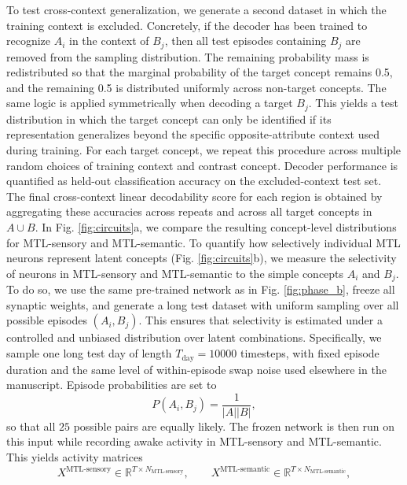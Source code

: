 \documentclass{article}
\begin{document}
To test cross-context generalization, we generate a second dataset in which the training context is excluded. Concretely, if the decoder has been trained to recognize $A_i$ in the context of $B_j$, then all test episodes containing $B_j$ are removed from the sampling distribution. The remaining probability mass is redistributed so that the marginal probability of the target concept remains 0.5, and the remaining 0.5 is distributed uniformly across non-target concepts. The same logic is applied symmetrically when decoding a target $B_j$. This yields a test distribution in which the target concept can only be identified if its representation generalizes beyond the specific opposite-attribute context used during training.
\newline\newline
For each target concept, we repeat this procedure across multiple random choices of training context and contrast concept. Decoder performance is quantified as held-out classification accuracy on the excluded-context test set. The final cross-context linear decodability score for each region is obtained by aggregating these accuracies across repeats and across all target concepts in $A \cup B$. In Fig. \ref{fig:circuits}a, we compare the resulting concept-level distributions for MTL-sensory and MTL-semantic.
To quantify how selectively individual MTL neurons represent latent concepts (Fig. \ref{fig:circuits}b), we measure the selectivity of neurons in MTL-sensory and MTL-semantic to the simple concepts $A_i$ and $B_j$. To do so, we use the same pre-trained network as in Fig. \ref{fig:phase_b}, freeze all synaptic weights, and generate a long test dataset with uniform sampling over all possible episodes $(A_i,B_j)$. This ensures that selectivity is estimated under a controlled and unbiased distribution over latent combinations.
\newline\newline
Specifically, we sample one long test day of length $T_\textrm{day}=10000$ timesteps, with fixed episode duration and the same level of within-episode swap noise used elsewhere in the manuscript. Episode probabilities are set to
\[
P(A_i,B_j)=\frac{1}{|A||B|},
\]
so that all $25$ possible pairs are equally likely. The frozen network is then run on this input while recording awake activity in MTL-sensory and MTL-semantic. This yields activity matrices
\[
X^\textrm{MTL-sensory}\in\mathbb{R}^{T\times N_\textrm{MTL-sensory}},
\qquad
X^\textrm{MTL-semantic}\in\mathbb{R}^{T\times N_\textrm{MTL-semantic}},
\]
\end{document}

